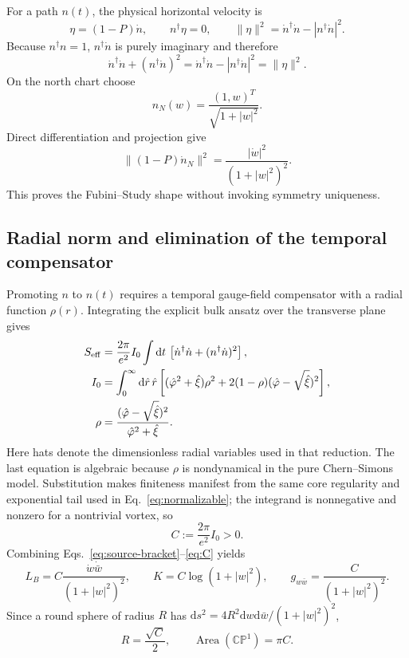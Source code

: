 \documentclass[11pt]{article}
\theoremstyle{definition}
\theoremstyle{remark}
\newcommand{\dd}{\mathrm d}
\newcommand{\CP}{\mathbb {CP}}
\begin{document}
For a path \(n(t)\), the physical horizontal velocity is
\begin{equation}
 \eta=(1-P)\dot n,\qquad n^\dagger\eta=0,\qquad
 \|\eta\|^2=\dot n^\dagger\dot n-|n^\dagger\dot n|^2.
 \label{eq:horizontal-velocity}
\end{equation}
Because \(n^\dagger n=1\), \(n^\dagger\dot n\) is purely imaginary and
therefore
\begin{equation}
 \dot n^\dagger\dot n+(n^\dagger\dot n)^2
 =\dot n^\dagger\dot n-|n^\dagger\dot n|^2=\|\eta\|^2.
 \label{eq:source-bracket}
\end{equation}
On the north chart choose
\begin{equation}
 n_N(w)=\frac{(1,w)^T}{\sqrt{1+|w|^2}}.
 \label{eq:north-section}
\end{equation}
Direct differentiation and projection give
\begin{equation}
 \|(1-P)\dot n_N\|^2
 =\frac{|\dot w|^2}{(1+|w|^2)^2}.
 \label{eq:fs-shape}
\end{equation}
This proves the Fubini--Study shape without invoking symmetry uniqueness.

\subsection{Radial norm and elimination of the temporal compensator}

Promoting \(n\) to \(n(t)\) requires a temporal gauge-field compensator
with a radial function \(\rho(r)\).  Integrating the explicit bulk ansatz
over the transverse plane gives~\cite{AldrovandiSchaposnik2007APE4SQM}
\begin{align}
 S_{\rm eff}
 &=\frac{2\pi}{e^2}I_0\int\dd t\,
 \left[\dot n^\dagger\dot n+(n^\dagger\dot n)^2\right],
 \label{eq:published-effective-action}\\
 I_0&=\int_0^\infty\dd\hat r\,\hat r\left[
 (\hat\varphi^2+\hat\xi)\rho^2
 +2(1-\rho)(\hat\varphi-\sqrt{\hat\xi})^2\right],
 \label{eq:i0}\\
 \rho&=\frac{(\hat\varphi-\sqrt{\hat\xi})^2}
 {\hat\varphi^2+\hat\xi}.
 \label{eq:rho}
\end{align}
Here hats denote the dimensionless radial variables used in that reduction.
The last equation is algebraic because \(\rho\) is nondynamical in the pure
Chern--Simons model.  Substitution makes finiteness manifest from the same
core regularity and exponential tail used in Eq.~\eqref{eq:normalizable};
the integrand is nonnegative and nonzero for a nontrivial vortex, so
\begin{equation}
 C:=\frac{2\pi}{e^2}I_0>0.
 \label{eq:C}
\end{equation}
Combining Eqs.~\eqref{eq:source-bracket}--\eqref{eq:C} yields
\begin{equation}
 \boxed{L_B=C\frac{\dot w\dot{\bar w}}{(1+|w|^2)^2}},\qquad
 K=C\log(1+|w|^2),\qquad
 g_{w\bar w}=\frac{C}{(1+|w|^2)^2}.
 \label{eq:LB}
\end{equation}
Since a round sphere of radius \(R\) has
\(\dd s^2=4R^2\dd w\dd\bar w/(1+|w|^2)^2\),
\begin{equation}
 R=\frac{\sqrt C}{2},\qquad \operatorname{Area}(\CP^1)=\pi C.
 \label{eq:radius-area}
\end{equation}
\end{document}
